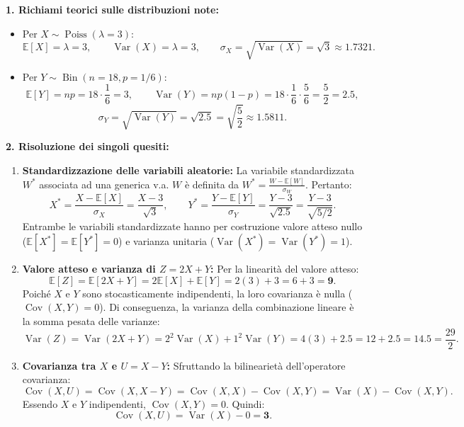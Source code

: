 \documentclass[11pt,a4paper]{article}
\newcommand{\EE}{\mathbb{E}}
\newcommand{\Var}{\operatorname{Var}}
\newcommand{\Cov}{\operatorname{Cov}}
\begin{document}
\begin{soluzionebox}
\textbf{1. Richiami teorici sulle distribuzioni note:}
\begin{itemize}
    \item Per $X \sim \operatorname{Poiss}(\lambda=3)$:
    \[
    \EE[X] = \lambda = 3, \qquad \Var(X) = \lambda = 3, \qquad \sigma_X = \sqrt{\Var(X)} = \sqrt{3} \approx 1.7321.
    \]
    \item Per $Y \sim \operatorname{Bin}(n=18, p=1/6)$:
    \[
    \EE[Y] = np = 18 \cdot \frac{1}{6} = 3, \qquad \Var(Y) = np(1-p) = 18 \cdot \frac{1}{6} \cdot \frac{5}{6} = \frac{5}{2} = 2.5,
    \]
    \[
    \sigma_Y = \sqrt{\Var(Y)} = \sqrt{2.5} = \sqrt{\frac{5}{2}} \approx 1.5811.
    \]
\end{itemize}

\textbf{2. Risoluzione dei singoli quesiti:}
\begin{enumerate}[label=(\roman*)]
    \item \textbf{Standardizzazione delle variabili aleatorie:}
    La variabile standardizzata $W^*$ associata ad una generica v.a. $W$ è definita da $W^* = \frac{W - \EE[W]}{\sigma_W}$. Pertanto:
    \[
    X^* = \frac{X - \EE[X]}{\sigma_X} = \frac{X - 3}{\sqrt{3}}, \qquad Y^* = \frac{Y - \EE[Y]}{\sigma_Y} = \frac{Y - 3}{\sqrt{2.5}} = \frac{Y - 3}{\sqrt{5/2}}.
    \]
    Entrambe le variabili standardizzate hanno per costruzione valore atteso nullo ($\EE[X^*]=\EE[Y^*]=0$) e varianza unitaria ($\Var(X^*)=\Var(Y^*)=1$).

    \item \textbf{Valore atteso e varianza di $Z = 2X + Y$:}
    Per la linearità del valore atteso:
    \[
    \EE[Z] = \EE[2X + Y] = 2\EE[X] + \EE[Y] = 2(3) + 3 = 6 + 3 = \bm{9}.
    \]
    Poiché $X$ e $Y$ sono stocasticamente indipendenti, la loro covarianza è nulla ($\Cov(X,Y)=0$). Di conseguenza, la varianza della combinazione lineare è la somma pesata delle varianze:
    \[
    \Var(Z) = \Var(2X + Y) = 2^2 \Var(X) + 1^2 \Var(Y) = 4(3) + 2.5 = 12 + 2.5 = \bm{14.5} = \frac{29}{2}.
    \]

    \item \textbf{Covarianza tra $X$ e $U = X - Y$:}
    Sfruttando la bilinearietà dell'operatore covarianza:
    \[
    \Cov(X, U) = \Cov(X, X - Y) = \Cov(X, X) - \Cov(X, Y) = \Var(X) - \Cov(X, Y).
    \]
    Essendo $X$ e $Y$ indipendenti, $\Cov(X, Y) = 0$. Quindi:
    \[
    \Cov(X, U) = \Var(X) - 0 = \bm{3}.
    \]
\end{enumerate}
\end{soluzionebox}
\end{document}

